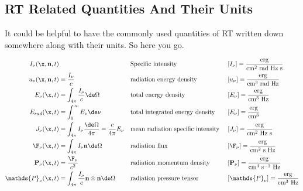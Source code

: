 \subsection{RT Related Quantities And Their Units}

It could be helpful to have the commonly used quantities of RT written down
somewhere along with their units. So here you go.


\begin{align*}
	I_\nu (\x, \mathbf{n}, t) &
			&& \text{Specific intensity}
			&& [I_\nu] = \frac{\text{erg}}{\text{cm}^2 \text{ rad Hz s}} \\
	u_\nu (\x, \mathbf{n}, t) &= \frac{I_\nu}{c}
			&& \text{radiation energy density }
			&& [u_\nu] = \frac{\text{erg}}{\text{cm}^3 \text{ rad Hz}}\\
	E_\nu (\x, t) &= \int_{4 \pi} \frac{I_\nu}{c} \de \Omega
			&& \text{total energy density }
			&& [E_\nu] = \frac{\text{erg}}{\text{cm}^3 \text{ Hz}}\\
	E_{rad} (\x, t) &= \int_{0}^{\infty} E_\nu \de \nu
			&& \text{total integrated energy density }
			&& [E_\nu] = \frac{\text{erg}}{\text{cm}^3}\\
	J_\nu (\x, t) &= \int_{4 \pi} I_\nu \frac{\de \Omega}{4 \pi}
			= \frac{c}{4 \pi} E_\nu
			&& \text{mean radiation specific intensity }
			&& [J_\nu] = \frac{\text{erg}}{\text{cm}^2 \text{ Hz s}}\\
	\F_\nu(\x, t) &= \int_{4 \pi}  I_\nu \mathbf{n} \de \Omega
			&& \text{radiation flux }
			&& [\F_\nu] = \frac{\text{erg}}{\text{cm}^2 \text{ s Hz}}\\
	\mathbf{P}_\nu (\x, t) &= \frac{\F_\nu}{c^2}
			&& \text{radiation momentum density }
			&& [\mathbf{P}_\nu] = \frac{\text{erg}}{ \text{cm}^4 \text{ s}^{-1} \text{ Hz}}\\
	\mathds{P}_\nu (\x, t) &= \int_{4 \pi} \frac{I_\nu}{c} \mathbf{n} \otimes \mathbf{n} \de \Omega
			&& \text{radiation pressure tensor }
			&& [\mathds{P}_\nu ] = \frac{\text{erg}}{\text{cm}^3 \text{ Hz}}
\end{align*}



